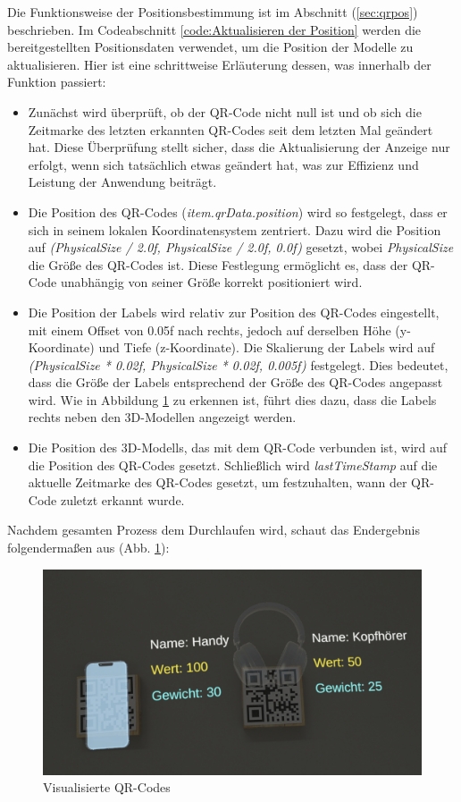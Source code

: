 Die Funktionsweise der Positionsbestimmung ist im Abschnitt (\ref{sec:qrpos}) beschrieben. Im Codeabschnitt \ref{code:Aktualisieren der Position} werden die bereitgestellten Positionsdaten verwendet, um die Position der Modelle zu aktualisieren. Hier ist eine schrittweise Erläuterung dessen, was innerhalb der Funktion passiert:
\begin{itemize}
\item Zunächst wird überprüft, ob der QR-Code nicht null ist und ob sich die Zeitmarke des letzten erkannten QR-Codes seit dem letzten Mal geändert hat. Diese Überprüfung stellt sicher, dass die Aktualisierung der Anzeige nur erfolgt, wenn sich tatsächlich etwas geändert hat, was zur Effizienz und Leistung der Anwendung beiträgt.
\item Die Position des QR-Codes (\textit{item.qrData.position}) wird so festgelegt, dass er sich in seinem lokalen Koordinatensystem zentriert. Dazu wird die Position auf \textit{(PhysicalSize / 2.0f, PhysicalSize / 2.0f, 0.0f)} gesetzt, wobei \textit{PhysicalSize} die Größe des QR-Codes ist. Diese Festlegung ermöglicht es, dass der QR-Code unabhängig von seiner Größe korrekt positioniert wird.
\item Die Position der Labels wird relativ zur Position des QR-Codes eingestellt, mit einem Offset von 0.05f nach rechts, jedoch auf derselben Höhe (y-Koordinate) und Tiefe (z-Koordinate). Die Skalierung der Labels wird auf \textit{(PhysicalSize * 0.02f, PhysicalSize * 0.02f, 0.005f)} festgelegt. Dies bedeutet, dass die Größe der Labels entsprechend der Größe des QR-Codes angepasst wird. Wie in Abbildung \ref{fig:visqr} zu erkennen ist, führt dies dazu, dass die Labels rechts neben den 3D-Modellen angezeigt werden.
\item Die Position des 3D-Modells, das mit dem QR-Code verbunden ist, wird auf die Position des QR-Codes gesetzt. Schließlich wird \textit{lastTimeStamp} auf die aktuelle Zeitmarke des QR-Codes gesetzt, um festzuhalten, wann der QR-Code zuletzt erkannt wurde.
\end{itemize}

Nachdem gesamten Prozess dem Durchlaufen wird, schaut das Endergebnis folgendermaßen aus (Abb. \ref{fig:visqr}):

\begin{figure}[H]
\centering
\includegraphics[scale=0.15, angle=0]{images/scanned}
\caption{Visualisierte QR-Codes}
\label{fig:visqr}
\end{figure}

